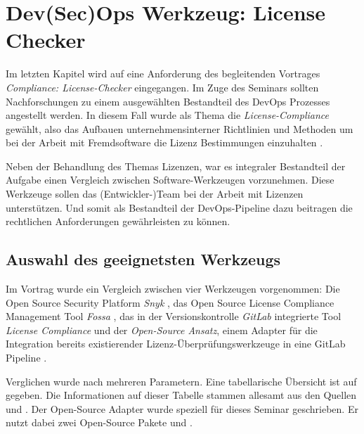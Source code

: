 \chapter{Dev(Sec)Ops Werkzeug: License Checker}

Im letzten Kapitel wird auf eine Anforderung des begleitenden Vortrages \emph{Compliance: License-Checker} eingegangen. 
Im Zuge des Seminars sollten Nachforschungen zu einem ausgewählten Bestandteil des DevOps Prozesses angestellt werden. 
In diesem Fall wurde als Thema die \emph{License-Compliance} gewählt, also das Aufbauen unternehmensinterner Richtlinien und Methoden um bei der Arbeit mit Fremdsoftware die Lizenz Bestimmungen einzuhalten \cite{validatisComplianceDefinitionBedeutung} \cite{haufe-lexwaregmbhcokgBedeutungComplianceFuer}.


\begin{sloppypar}
Neben der Behandlung des Themas Lizenzen, war es integraler Bestandteil der Aufgabe einen Vergleich zwischen Software-Werkzeugen vorzunehmen. Diese Werkzeuge sollen das \mbox{(Entwickler-)Team} bei der Arbeit mit Lizenzen unterstützen. Und somit als Bestandteil der DevOps-Pipeline dazu beitragen die rechtlichen Anforderungen gewährleisten zu können.
\end{sloppypar}

\section{Auswahl des geeignetsten Werkzeugs}

Im Vortrag wurde ein Vergleich zwischen vier Werkzeugen vorgenommen: Die \glqq Open Source Security Platform\grqq{} \emph{Snyk} \cite{snykLicensingComplianceManagement}, das \glqq Open Source License Compliance Management Tool\grqq{} \emph{Fossa} \cite{fossaOpenSourceLicense}, das in der Versionskontrolle \emph{GitLab} integrierte Tool \emph{License Compliance} \cite{gitlabLicenseComplianceGitLab} und der \emph{Open-Source Ansatz}, einem Adapter für die Integration bereits existierender Lizenz-Überprüfungs\-werkzeuge in eine GitLab Pipeline \cite{kellOpenSourceLicenseChecker2021}.

Verglichen wurde nach mehreren Parametern. Eine tabellarische Übersicht ist auf  gegeben. Die Informationen auf dieser Tabelle stammen allesamt aus den Quellen \cite{snykLicensingComplianceManagement} \cite{fossaOpenSourceLicense} und \cite{gitlabLicenseComplianceGitLab}. Der Open-Source Adapter wurde speziell für dieses Seminar geschrieben. Er nutzt dabei zwei Open-Source Pakete \cite{glassNPMLicenseChecker} und \cite{bauernfeindComposerLicenseChecker}.

